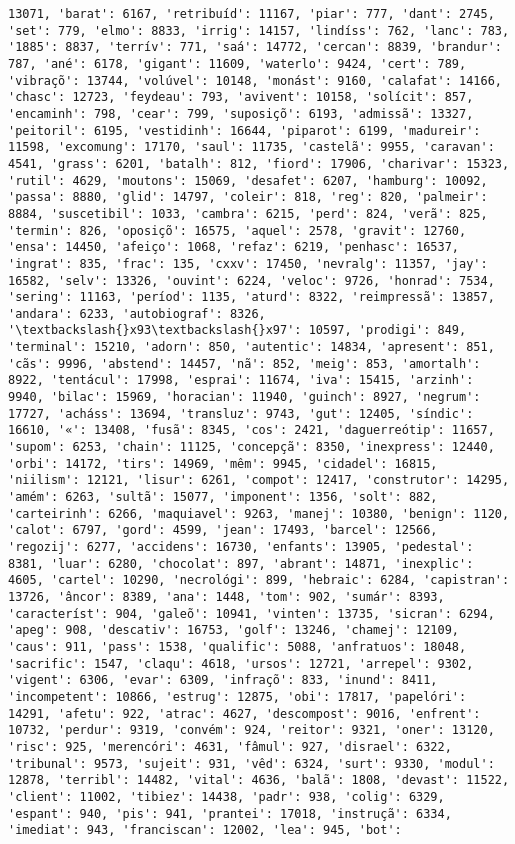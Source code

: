 \documentclass[11pt]{article}
\begin{document}
\begin{Verbatim}[commandchars=\\\{\}]
13071, 'barat': 6167, 'retribuíd': 11167, 'piar': 777, 'dant': 2745, 'set': 779, 'elmo': 8833, 'irrig': 14157, 'lindíss': 762, 'lanc': 783, '1885': 8837, 'terrív': 771, 'saá': 14772, 'cercan': 8839, 'brandur': 787, 'ané': 6178, 'gigant': 11609, 'waterlo': 9424, 'cert': 789, 'vibraçõ': 13744, 'volúvel': 10148, 'monást': 9160, 'calafat': 14166, 'chasc': 12723, 'feydeau': 793, 'avivent': 10158, 'solícit': 857, 'encaminh': 798, 'cear': 799, 'suposiçõ': 6193, 'admissã': 13327, 'peitoril': 6195, 'vestidinh': 16644, 'piparot': 6199, 'madureir': 11598, 'excomung': 17170, 'saul': 11735, 'castelã': 9955, 'caravan': 4541, 'grass': 6201, 'batalh': 812, 'fiord': 17906, 'charivar': 15323, 'rutil': 4629, 'moutons': 15069, 'desafet': 6207, 'hamburg': 10092, 'passa': 8880, 'glid': 14797, 'coleir': 818, 'reg': 820, 'palmeir': 8884, 'suscetibil': 1033, 'cambra': 6215, 'perd': 824, 'verã': 825, 'termin': 826, 'oposiçõ': 16575, 'aquel': 2578, 'gravit': 12760, 'ensa': 14450, 'afeiço': 1068, 'refaz': 6219, 'penhasc': 16537, 'ingrat': 835, 'frac': 135, 'cxxv': 17450, 'nevralg': 11357, 'jay': 16582, 'selv': 13326, 'ouvint': 6224, 'veloc': 9726, 'honrad': 7534, 'sering': 11163, 'períod': 1135, 'aturd': 8322, 'reimpressã': 13857, 'andara': 6233, 'autobiograf': 8326, '\textbackslash{}x93\textbackslash{}x97': 10597, 'prodigi': 849, 'terminal': 15210, 'adorn': 850, 'autentic': 14834, 'apresent': 851, 'cãs': 9996, 'abstend': 14457, 'nã': 852, 'meig': 853, 'amortalh': 8922, 'tentácul': 17998, 'esprai': 11674, 'iva': 15415, 'arzinh': 9940, 'bilac': 15969, 'horacian': 11940, 'guinch': 8927, 'negrum': 17727, 'acháss': 13694, 'transluz': 9743, 'gut': 12405, 'síndic': 16610, '«': 13408, 'fusã': 8345, 'cos': 2421, 'daguerreótip': 11657, 'supom': 6253, 'chain': 11125, 'concepçã': 8350, 'inexpress': 12440, 'orbi': 14172, 'tirs': 14969, 'mêm': 9945, 'cidadel': 16815, 'niilism': 12121, 'lisur': 6261, 'compot': 12417, 'construtor': 14295, 'amém': 6263, 'sultã': 15077, 'imponent': 1356, 'solt': 882, 'carteirinh': 6266, 'maquiavel': 9263, 'manej': 10380, 'benign': 1120, 'calot': 6797, 'gord': 4599, 'jean': 17493, 'barcel': 12566, 'regozij': 6277, 'accidens': 16730, 'enfants': 13905, 'pedestal': 8381, 'luar': 6280, 'chocolat': 897, 'abrant': 14871, 'inexplic': 4605, 'cartel': 10290, 'necrológi': 899, 'hebraic': 6284, 'capistran': 13726, 'âncor': 8389, 'ana': 1448, 'tom': 902, 'sumár': 8393, 'característ': 904, 'galeõ': 10941, 'vinten': 13735, 'sicran': 6294, 'apeg': 908, 'descativ': 16753, 'golf': 13246, 'chamej': 12109, 'caus': 911, 'pass': 1538, 'qualific': 5088, 'anfratuos': 18048, 'sacrific': 1547, 'claqu': 4618, 'ursos': 12721, 'arrepel': 9302, 'vigent': 6306, 'evar': 6309, 'infraçõ': 833, 'inund': 8411, 'incompetent': 10866, 'estrug': 12875, 'obi': 17817, 'papelóri': 14291, 'afetu': 922, 'atrac': 4627, 'descompost': 9016, 'enfrent': 10732, 'perdur': 9319, 'convém': 924, 'reitor': 9321, 'oner': 13120, 'risc': 925, 'merencóri': 4631, 'fâmul': 927, 'disrael': 6322, 'tribunal': 9573, 'sujeit': 931, 'vêd': 6324, 'surt': 9330, 'modul': 12878, 'terribl': 14482, 'vital': 4636, 'balã': 1808, 'devast': 11522, 'client': 11002, 'tibiez': 14438, 'padr': 938, 'colig': 6329, 'espant': 940, 'pis': 941, 'prantei': 17018, 'instruçã': 6334, 'imediat': 943, 'franciscan': 12002, 'lea': 945, 'bot': 
\end{Verbatim}
\end{document}
